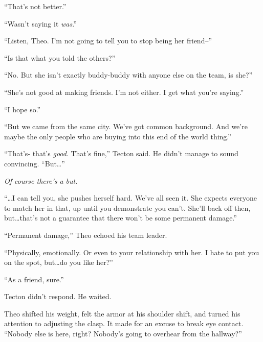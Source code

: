 ``That's not better.''



``Wasn't saying it \emph{was}.''



``Listen, Theo.  I'm not going to tell you to stop being her friend--''



``Is that what you told the others?''



``No.  But she isn't exactly buddy-buddy with anyone else on the team, is she?''



``She's not good at making friends.  I'm not either.  I get what you're saying.''



``I hope so.''



``But we came from the same city.  We've got common background.  And we're maybe the only people who are buying into this end of the world thing.''



``That's- that's \emph{good}.  That's fine,'' Tecton said.  He didn't manage to sound convincing.  ``But\ldots''



\emph{Of course there's a but}.



``\ldots{}I can tell you, she pushes herself hard.  We've all seen it.  She expects everyone to match her in that, up until you demonstrate you can't.  She'll back off then, but\ldots that's not a guarantee that there won't be some permanent damage.''



``Permanent damage,'' Theo echoed his team leader.



``Physically, emotionally.  Or even to your relationship with her.  I hate to put you on the spot, but\ldots do you like her?''



``As a friend, sure.''



Tecton didn't respond.  He waited.



Theo shifted his weight, felt the armor at his shoulder shift, and turned his attention to adjusting the clasp.  It made for an excuse to break eye contact.  ``Nobody else is here, right?  Nobody's going to overhear from the hallway?''



